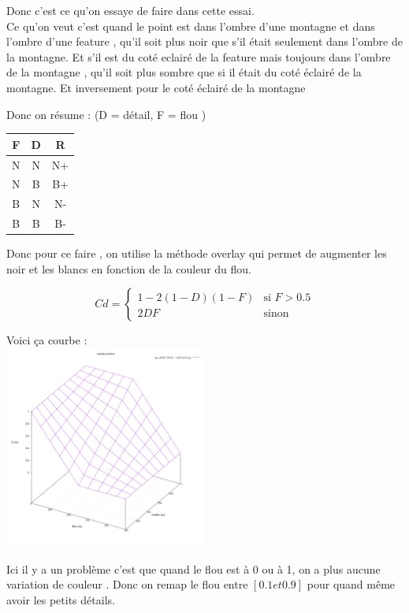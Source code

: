 \documentclass[a4paper]{article}
\begin{document}
Donc c'est ce qu'on essaye de faire dans cette essai.\\
Ce qu'on veut c'est quand le point est dans l'ombre d'une montagne et dans l'ombre d'une feature , qu'il soit plus noir que s'il était seulement dans l'ombre de la montagne. Et s'il est du coté eclairé de la feature mais toujours dans l'ombre de la montagne , qu'il soit plus sombre que si il était du coté éclairé de la montagne. Et inversement pour le coté éclairé de la montagne


Donc on résume : (D = détail, F = flou ) \\
\begin{tabular}{|c|c|c|}
  \hline
  F & D & R \\
  \hline
  N & N & N+ \\
  N & B & B+ \\
  B & N & N- \\
  B & B & B- \\
  \hline
\end{tabular}

Donc pour ce faire , on utilise la méthode overlay qui permet de augmenter les noir et les blancs en fonction de la couleur du flou. 

 

\[ Cd = 
\left\{
    \begin{array}{ll}
        1-2(1-D)(1-F)& \mbox{si } F > 0.5 \\
		2DF  & \mbox{sinon}				
    \end{array}
\right.
\]

Voici ça courbe : \\
\includegraphics[width=0.5\textwidth]{graphes/overlay_curve.png}

Ici il y a un problème c'est que quand le flou est à 0 ou à 1, on a plus aucune variation de couleur . Donc on remap le flou entre $[0.1 et 0.9]$ pour quand même avoir les petits détails.
\end{document}
